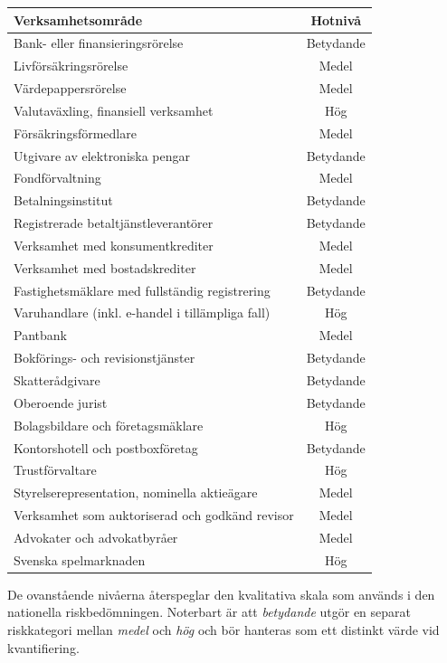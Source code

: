 \documentclass{article}
\begin{document}
\begin{center}
\begin{tabular}{|p{9cm}|c|}
\hline
\textbf{Verksamhetsområde} & \textbf{Hotnivå} \\
\hline
Bank- eller finansieringsrörelse & Betydande \\
Livförsäkringsrörelse & Medel \\
Värdepappersrörelse & Medel \\
Valutaväxling, finansiell verksamhet & Hög \\
Försäkringsförmedlare & Medel\\
Utgivare av elektroniska pengar & Betydande \\
Fondförvaltning & Medel\\
Betalningsinstitut & Betydande \\
Registrerade betaltjänstleverantörer & Betydande \\
Verksamhet med konsumentkrediter & Medel \\
Verksamhet med bostadskrediter & Medel \\
Fastighetsmäklare med fullständig registrering & Betydande \\
Varuhandlare (inkl. e-handel i tillämpliga fall) & Hög \\
Pantbank & Medel \\
Bokförings- och revisionstjänster & Betydande \\
Skatterådgivare & Betydande \\
Oberoende jurist & Betydande \\
Bolagsbildare och företagsmäklare & Hög \\
Kontorshotell och postboxföretag & Betydande \\
Trustförvaltare & Hög \\
Styrelserepresentation, nominella aktieägare & Medel \\
Verksamhet som auktoriserad och godkänd revisor & Medel \\
Advokater och advokatbyråer & Medel \\
Svenska spelmarknaden & Hög \\
\hline
\end{tabular}
\end{center}

De ovanstående nivåerna återspeglar den kvalitativa skala som används i den nationella riskbedömningen. Noterbart är att \textit{betydande} utgör en separat riskkategori mellan \textit{medel} och \textit{hög} och bör hanteras som ett distinkt värde vid kvantifiering.
\end{document}
